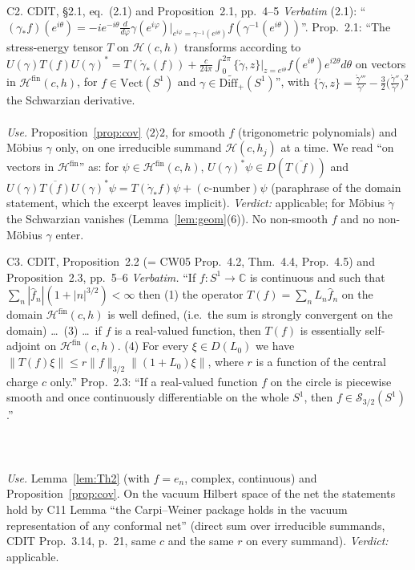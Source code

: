\documentclass[11pt]{article}
\newcommand{\norm}[1]{\lVert#1\rVert}
\newcommand{\Diff}{\mathrm{Diff}_+}
\begin{document}
\begin{citedbox}{C2. CDIT, \S2.1, eq.~(2.1) and Proposition~2.1, pp.~4--5}
\emph{Verbatim} (2.1): ``$(\gamma_*f)(e^{i\theta})=-ie^{-i\theta}\frac{d}{d\varphi}\gamma(e^{i\varphi})
\big|_{e^{i\varphi}=\gamma^{-1}(e^{i\theta})}f(\gamma^{-1}(e^{i\theta}))$''.  Prop.~2.1: ``The stress-energy tensor $T$
on $\mathcal H(c,h)$ transforms according to $U(\gamma)T(f)U(\gamma)^*=T(\mathring\gamma_*(f))+\frac c{24\pi}
\int_0^{2\pi}\{\mathring\gamma,z\}|_{z=e^{i\theta}}f(e^{i\theta})e^{i2\theta}d\theta$ on vectors in
$\mathcal H^{\mathrm{fin}}(c,h)$, for $f\in\mathrm{Vect}(S^1)$ and $\gamma\in\widetilde{\Diff}(S^1)$'', with
$\{\mathring\gamma,z\}=\frac{\mathring\gamma'''}{\mathring\gamma'}-\frac32\bigl(\frac{\mathring\gamma''}{\mathring\gamma'}\bigr)^2$
the Schwarzian derivative.\\[2pt]
\\[2pt]
\emph{Use.} Proposition~\ref{prop:cov} $\langle2\rangle2$, for smooth $f$ (trigonometric polynomials) and
Möbius $\gamma$ only, on one irreducible summand $\mathcal H(c,h_j)$ at a time.  We read ``on vectors in
$\mathcal H^{\mathrm{fin}}$'' as: for $\psi\in\mathcal H^{\mathrm{fin}}(c,h)$, $U(\gamma)^*\psi\in D(\overline{T(f)})$
and $U(\gamma)\overline{T(f)}U(\gamma)^*\psi=T(\mathring\gamma_*f)\psi+(\text{c-number})\psi$ (paraphrase of the domain
statement, which the excerpt leaves implicit).  \emph{Verdict:} applicable; for Möbius $\mathring\gamma$ the Schwarzian
vanishes (Lemma~\ref{lem:geom}(6)).  No non-smooth $f$ and no non-Möbius $\gamma$ enter.
\end{citedbox}

\begin{citedbox}{C3. CDIT, Proposition~2.2 (= CW05 Prop.~4.2, Thm.~4.4, Prop.~4.5) and Proposition~2.3, pp.~5--6}
\emph{Verbatim.} ``If $f:S^1\to\mathbb C$ is continuous and such that $\sum_n|\hat f_n|(1+|n|^{3/2})<\infty$ then
(1) the operator $T(f)=\sum_nL_n\hat f_n$ on the domain $\mathcal H^{\mathrm{fin}}(c,h)$ is well defined, (i.e.\ the sum
is strongly convergent on the domain) \dots\ (3) \dots\ if $f$ is a real-valued function, then $T(f)$ is
essentially self-adjoint on $\mathcal H^{\mathrm{fin}}(c,h)$.  (4) For every $\xi\in D(L_0)$ we have
$\norm{T(f)\xi}\le r\norm f_{3/2}\norm{(1+L_0)\xi}$, where $r$ is a function of the central charge $c$ only.''
Prop.~2.3: ``If a real-valued function $f$ on the circle is piecewise smooth and once continuously differentiable on
the whole $S^1$, then $f\in\mathcal S_{3/2}(S^1)$.''\\[2pt]
\\[2pt]
\\[2pt]
\\[2pt]
\emph{Use.} Lemma~\ref{lem:Th2} (with $f=e_n$, complex, continuous) and Proposition~\ref{prop:cov}.  On the vacuum
Hilbert space of the net the statements hold by C11 Lemma ``the Carpi--Weiner package holds in the vacuum
representation of any conformal net'' (direct sum over irreducible summands, CDIT Prop.~3.14, p.~21, same $c$ and
the same $r$ on every summand).  \emph{Verdict:} applicable.
\end{citedbox}
\end{document}
